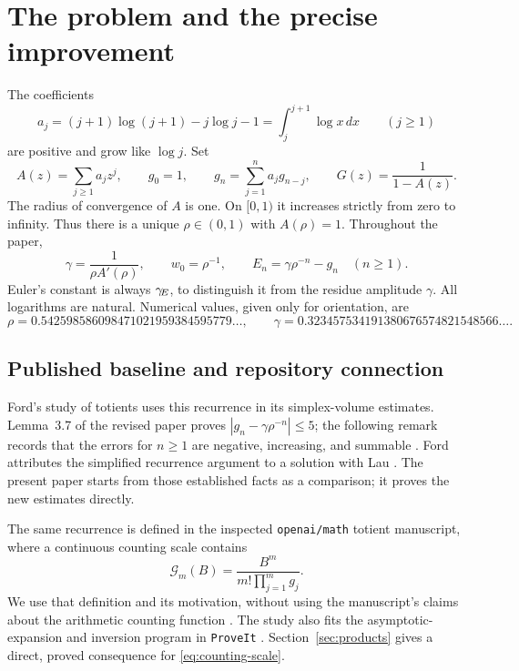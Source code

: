 \section{The problem and the precise improvement}
\label{sec:scope}

The coefficients
\begin{equation}\label{eq:definition-a}
 a_j=(j+1)\log(j+1)-j\log j-1
     =\int_j^{j+1}\log x\,dx\qquad(j\ge1)
\end{equation}
are positive and grow like $\log j$. Set
\begin{equation}\label{eq:definition-g}
 A(z)=\sum_{j\ge1}a_jz^j,\qquad
 g_0=1,\qquad g_n=\sum_{j=1}^n a_jg_{n-j},\qquad
 G(z)=\frac1{1-A(z)}.
\end{equation}
The radius of convergence of $A$ is one. On $[0,1)$ it increases
strictly from zero to infinity. Thus there is a unique $\rho\in(0,1)$
with $A(\rho)=1$. Throughout the paper,
\begin{equation}\label{eq:normalization}
 \gamma=\frac1{\rho A'(\rho)},\qquad
 w_0=\rho^{-1},\qquad
 E_n=\gamma\rho^{-n}-g_n\quad(n\ge1).
\end{equation}
Euler's constant is always $\gamma_{\!E}$, to distinguish it from the residue
amplitude $\gamma$. All logarithms are natural. Numerical values, given
only for orientation, are
\[
 \rho=0.542598586098471021959384595779\ldots,
 \qquad \gamma=0.323457534191380676574821548566\ldots.
\]

\subsection{Published baseline and repository connection}

Ford's study of totients uses this recurrence in its simplex-volume
estimates. Lemma~3.7 of the revised paper proves
$|g_n-\gamma\rho^{-n}|\le5$; the following remark records that the
errors for $n\ge1$ are negative, increasing, and summable
\cite[Lemma~3.7 and Remark~1]{Ford}. Ford attributes the simplified
recurrence argument to a solution with Lau \cite{FordLau}.
The present paper starts from those established facts as a comparison;
it proves the new estimates directly.

The same recurrence is defined in the inspected \texttt{openai/math}
totient manuscript, where a continuous counting scale contains
\begin{equation}\label{eq:counting-scale}
 \mathcal G_m(B)=\frac{B^m}{m!\prod_{j=1}^m g_j}.
\end{equation}
We use that definition and its motivation, without using the manuscript's
claims about the arithmetic counting function \cite{OpenAIMath}.
The study also fits the asymptotic-expansion and inversion program in
\texttt{ProveIt} \cite{ProveIt}. Section~\ref{sec:products} gives a
direct, proved consequence for \eqref{eq:counting-scale}.

